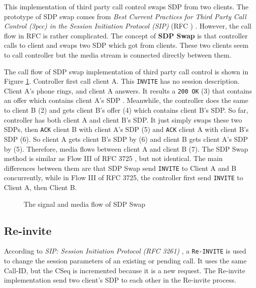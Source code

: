 This implementation of third party call control swaps SDP from two clients. The prototype of SDP swap comes from  \textit{Best Current Practices for Third Party Call Control (3pcc) in the Session Initiation Protocol (SIP)} (RFC \nolinebreak {}) \cite{RFC3725}. However, the call flow in RFC \nolinebreak {} is rather complicated. The concept of \textbf{SDP Swap} is that controller calls to client and swaps two SDP which got from clients. These two clients seem to call controller but the media stream is connected directly between them.

The call flow of SDP swap implementation of third party call control is shown in Figure \ref{fig:SdpSwap}. Controller first call client A. This \texttt{INVITE} has no session description. Client A's phone rings, and client A answers. It results a \texttt{200 OK} (3) that contains an offer which contains client A's SDP \cite{RFC3261}. Meanwhile, the controller does the same to client B (2) and gets client B's offer (4) which contains client B's SDP. So far, controller has both client A and client B's SDP. It just simply swaps these two SDPs, then \texttt{ACK} client B with client A's SDP (5) and \texttt{ACK} client A with client B's SDP (6). So client A gets client B's SDP by (6) and client B gets client A's SDP by (5). Therefore, media flows between client A and client B (7). The \textsf{SDP Swap} method is similar as \textsf{Flow III} of RFC 3725 \cite{RFC3725}, but not identical. The main differences between them  are that {SDP Swap} send \texttt{INVITE} to Client A and B concurrently, while in \textsf{Flow III} of RFC 3725, the controller first send \texttt{INVITE} to Client A, then Client B.

\begin{figure}[!hbtp]
\centering
{}
\caption{The signal and media flow of SDP Swap}
\label{fig:SdpSwap}
\end{figure}

\subsection{Re-invite}
\label{sec:Solution:ThirdPartyCall:Re-invite}

According to \textit{SIP: Session Initiation Protocol (RFC 3261)} \cite{RFC3261}, a \texttt{Re-INVITE} is used to change the session parameters of an existing or pending call. It uses the same Call-ID, but the CSeq is incremented because it is a new request. The Re-invite implementation send two client's SDP to each other in the Re-invite process. 

